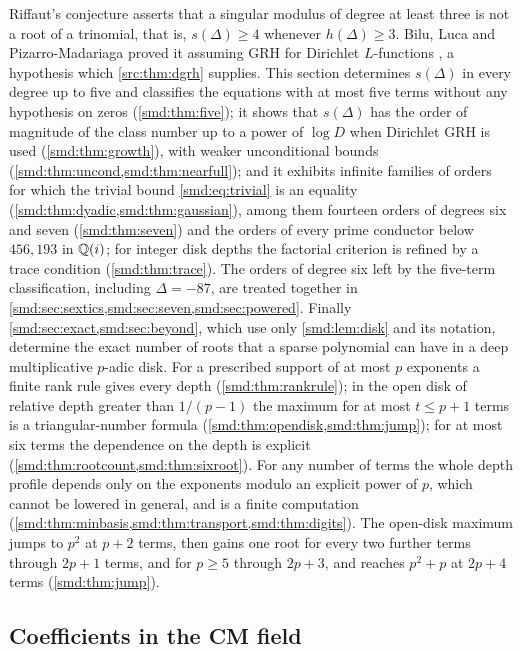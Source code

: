 Riffaut's conjecture asserts that a singular modulus of degree at least three is not a root
of a trinomial, that is, $s(\Delta)\ge4$ whenever $h(\Delta)\ge3$. Bilu, Luca and
Pizarro-Madariaga proved it assuming GRH for Dirichlet $L$-functions
\cite{Bilu2022Trinomials}, a hypothesis which \cref{src:thm:dgrh} supplies. This section
determines $s(\Delta)$ in every degree up to five and classifies the equations with at most
five terms without any hypothesis on zeros (\cref{smd:thm:five}); it shows that
$s(\Delta)$ has the order of magnitude of the class number up to a power of
$\log D$ when Dirichlet GRH is used (\cref{smd:thm:growth}), with weaker unconditional
bounds (\cref{smd:thm:uncond,smd:thm:nearfull}); and it exhibits infinite families of orders
for which the trivial bound \eqref{smd:eq:trivial} is an equality
(\cref{smd:thm:dyadic,smd:thm:gaussian}), among them fourteen orders of degrees six and seven
(\cref{smd:thm:seven}) and the orders of every prime conductor below $456{,}193$ in
$\mathbb{Q}(i)$; for integer disk depths the factorial criterion is refined by a trace condition
(\cref{smd:thm:trace}). The orders of degree six left by the five-term classification,
including $\Delta=-87$, are treated together in
\cref{smd:sec:sextics,smd:sec:seven,smd:sec:powered}. Finally
\cref{smd:sec:exact,smd:sec:beyond}, which use only \cref{smd:lem:disk} and its notation,
determine the exact number of roots that a sparse polynomial can have in a deep
multiplicative $p$-adic disk. For a prescribed support of at most $p$ exponents a finite rank
rule gives every depth (\cref{smd:thm:rankrule}); in the open disk of relative depth greater
than $1/(p-1)$ the maximum for at most $t\le p+1$ terms is a triangular-number formula
(\cref{smd:thm:opendisk,smd:thm:jump}); for at most six terms the dependence on the depth is
explicit (\cref{smd:thm:rootcount,smd:thm:sixroot}). For any number of terms the whole depth
profile depends only on the exponents modulo an explicit power of $p$, which cannot be lowered
in general, and is a finite computation (\cref{smd:thm:minbasis,smd:thm:transport,smd:thm:digits}).
The open-disk maximum jumps to $p^2$ at $p+2$ terms, then gains one root for every two further
terms through $2p+1$ terms, and for $p\ge5$ through $2p+3$, and reaches $p^2+p$ at $2p+4$ terms
(\cref{smd:thm:jump}).

\subsection{Coefficients in the CM field}
{\raggedright{}}

